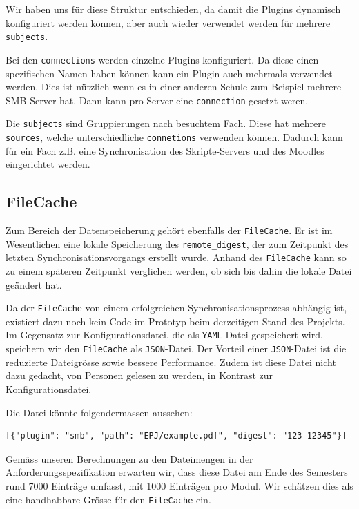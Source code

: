 \documentclass[a4paper]{article}
\begin{document}
Wir haben uns für diese Struktur entschieden, da damit die Plugins dynamisch konfiguriert werden können, aber auch wieder verwendet werden für mehrere \verb|subjects|.

Bei den \verb|connections| werden einzelne Plugins konfiguriert.
Da diese einen spezifischen Namen haben können kann ein Plugin auch mehrmals verwendet werden.
Dies ist nützlich wenn es in einer anderen Schule zum Beispiel mehrere SMB-Server hat.
Dann kann pro Server eine \verb|connection| gesetzt weren.

Die \verb|subjects| sind Gruppierungen nach besuchtem Fach.
Diese hat mehrere \verb|sources|, welche unterschiedliche \verb|connetions| verwenden können.
Dadurch kann für ein Fach z.B. eine Synchronisation des Skripte-Servers und des Moodles eingerichtet werden.

\subsection{FileCache}

Zum Bereich der Datenspeicherung gehört ebenfalls der \verb|FileCache|. Er ist im Wesentlichen eine lokale Speicherung des \verb|remote_digest|, der zum Zeitpunkt des letzten Synchronisationsvorgangs erstellt wurde. Anhand des \verb|FileCache| kann so zu einem späteren Zeitpunkt verglichen werden, ob sich bis dahin die lokale Datei geändert hat.

Da der \verb|FileCache| von einem erfolgreichen Synchronisationsprozess abhängig ist, existiert dazu noch kein Code im Prototyp beim derzeitigen Stand des Projekts. Im Gegensatz zur Konfigurationsdatei, die als \verb|YAML|-Datei gespeichert wird, speichern wir den \verb|FileCache| als \verb|JSON|-Datei. Der Vorteil einer \verb|JSON|-Datei ist die reduzierte Dateigrösse sowie bessere Performance. Zudem ist diese Datei nicht dazu gedacht, von Personen gelesen zu werden, in Kontrast zur Konfigurationsdatei.

Die Datei könnte folgendermassen aussehen:

\begin{verbatim}
[{"plugin": "smb", "path": "EPJ/example.pdf", "digest": "123-12345"}]
\end{verbatim}

Gemäss unseren Berechnungen zu den Dateimengen in der Anforderungsspezifikation erwarten wir, dass diese Datei am Ende des Semesters rund 7000 Einträge umfasst, mit 1000 Einträgen pro Modul. Wir schätzen dies als eine handhabbare Grösse für den \verb|FileCache| ein.
\end{document}
